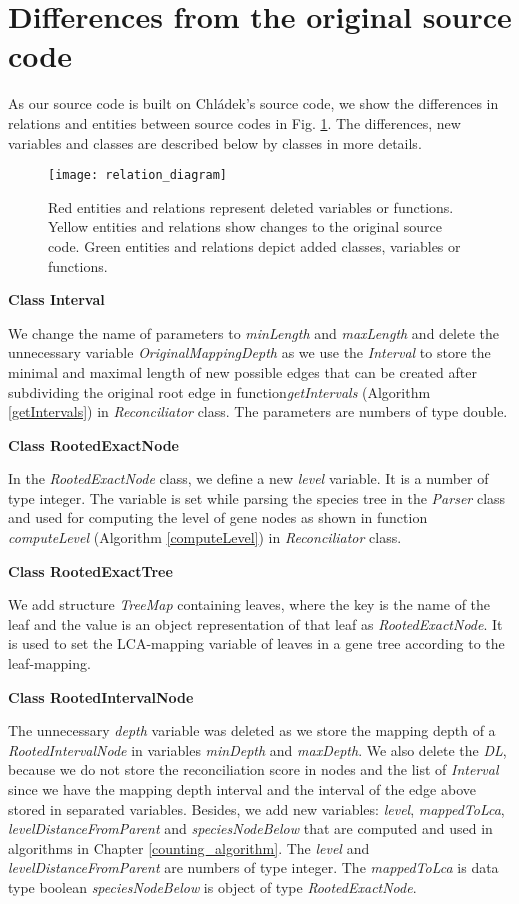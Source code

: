 \section{Differences from the original source code}

As our source code is built on Chládek's source code, we show the differences in relations and entities between source codes in Fig. \ref{relation_diagram}. The differences, new variables and classes are described below by classes in more details.\\
\begin{figure}[ht!]
	\centering
	\label{relation_diagram}
  	\texttt{[image: relation\_diagram]}
  	\caption[Entity-relationship diagram with differences]{Red entities and relations represent deleted variables or functions. Yellow entities and relations show changes to the original source code. Green entities and relations depict added classes, variables or functions.}
\end{figure}

\noindent \textbf{Class Interval}

We change the name of parameters to \emph{minLength} and \emph{maxLength} and delete the unnecessary variable \emph{OriginalMappingDepth} as we use the \emph{Interval} to store the minimal and maximal length of new possible edges that can be created after subdividing the original root edge in function\emph{getIntervals} (Algorithm \ref{getIntervals}) in \emph{Reconciliator} class. The parameters are numbers of type double.

\noindent \textbf{Class RootedExactNode}

In the \emph{RootedExactNode} class, we define a new \emph{level} variable. It is a number of type integer. The variable is set while parsing the species tree in the \emph{Parser} class and used for computing the level of gene nodes as shown in function \emph{computeLevel} (Algorithm \ref{computeLevel}) in \emph{Reconciliator} class.

\noindent \textbf{Class RootedExactTree}

We add structure \emph{TreeMap} containing leaves, where the key is the name of the leaf and the value is an object representation of that leaf as \emph{RootedExactNode}. It is used to set the LCA-mapping variable of leaves in a gene tree according to the leaf-mapping.

\noindent \textbf{Class RootedIntervalNode}

The unnecessary \emph{depth} variable was deleted as we store the mapping depth of a \emph{RootedIntervalNode} in variables \emph{minDepth} and \emph{maxDepth}. We also delete the \emph{DL}, because we do not store the reconciliation score in nodes and the list of \emph{Interval} since we have the mapping depth interval and the interval of the edge above stored in separated variables. Besides, we add new variables: \emph{level}, \emph{mappedToLca}, \emph{levelDistanceFromParent} and \emph{speciesNodeBelow} that are computed and used in algorithms in Chapter \ref{counting_algorithm}. The \emph{level} and \emph{levelDistanceFromParent} are numbers of type integer. The \emph{mappedToLca} is data type boolean \emph{speciesNodeBelow} is object of type \emph{RootedExactNode}.

